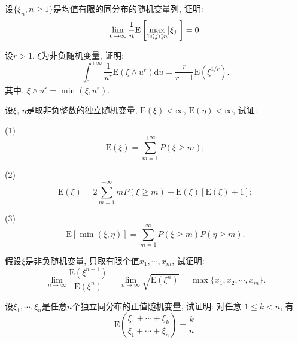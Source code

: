 \begin{yyEx}
	设$\{\xi_n,n\geqslant 1\}$是均值有限的同分布的随机变量列, 证明:
	\begin{equation}
	\lim_{n\to\infty}\frac{1}{n}\mathrm{E}\left[ \max_{1\leqslant j\leqslant n}\lvert\xi_j\rvert \right] = 0.
	\end{equation}
\end{yyEx}

\begin{yyEx}
	设$r>1$, $\xi$为非负随机变量, 证明:
	\begin{equation}
	\int_{0}^{+\infty}\frac{1}{u^r}\mathrm{E}(\xi \wedge u^r)\mathrm{d}u = \frac{r}{r-1}\mathrm{E}(\xi^{1/r}).
	\end{equation}
	其中, $\xi\wedge u^r = \min(\xi,u^r)$.
\end{yyEx}

\begin{yyEx}
	设$\xi$, $\eta$是取非负整数的独立随机变量, $\mathrm{E}(\xi)<\infty$, $\mathrm{E}(\eta)<\infty$, 试证:
	\begin{blist}
		\item[(1)] \begin{equation}
		\mathrm{E}(\xi) = \sum_{m=1}^{+\infty}P(\xi\geqslant m);
		\end{equation}
		\item[(2)] \begin{equation}
		\mathrm{E}(\xi) = 2\sum_{m=1}^{+\infty}mP(\xi\geqslant m)-\mathrm{E}(\xi)\left[\mathrm{E}(\xi)+1\right];
		\end{equation}
		\item[(3)] \begin{equation}
		\mathrm{E}\left[ \min(\xi,\eta) \right] = \sum_{m=1}^{\infty}P(\xi\geqslant m)P(\eta\geqslant m).
		\end{equation}
	\end{blist}
\end{yyEx}

\begin{yyEx}
	假设$\xi$是非负随机变量, 只取有限个值$x_1,\cdots,x_m$, 试证明:\begin{equation}
	\lim_{n\to\infty}\frac{\mathrm{E}(\xi^{n+1})}{\mathrm{E}(\xi^n)} = \lim_{n\to\infty}\sqrt{\mathrm{E}(\xi^n)} = \max\{x_1,x_2,\cdots,x_m\}.
	\end{equation}
\end{yyEx}

\begin{yyEx}
	设$\xi_1,\cdots,\xi_n$是任意$n$个独立同分布的正值随机变量, 试证明: 对任意
	$1\leqslant k<n$, 有\begin{equation}
	\mathrm{E}\left( \frac{\xi_1+\cdots+\xi_k}{\xi_1+\cdots+\xi_n} \right) = \frac{k}{n}.
	\end{equation}
\end{yyEx}

